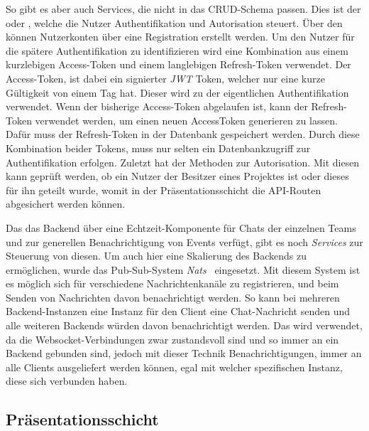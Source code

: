 So gibt es aber auch Services, die nicht in das CRUD-Schema passen. Dies ist
\zb{} der  oder , welche die Nutzer Authentifikation und
Autorisation steuert. Über den  können Nutzerkonten
über eine Registration erstellt werden. Um den Nutzer für die spätere Authentifikation zu
identifizieren wird eine Kombination aus einem kurzlebigen Access-Token und
einem langlebigen Refresh-Token verwendet. Der Access-Token, ist dabei ein
signierter \emph{JWT} Token, welcher nur eine kurze Gültigkeit von einem Tag
hat. Dieser wird zu der eigentlichen Authentifikation verwendet. Wenn der
bisherige Access-Token abgelaufen ist, kann der Refresh-Token verwendet werden,
um einen neuen AccessToken generieren zu lassen. Dafür muss der Refresh-Token
in der Datenbank gespeichert werden. Durch diese Kombination beider Tokens, muss
nur selten ein Datenbankzugriff zur Authentifikation erfolgen. Zuletzt hat der
 Methoden zur Autorisation. Mit diesen kann geprüft werden,
ob ein Nutzer der Besitzer eines Projektes ist oder dieses für ihn geteilt
wurde, womit in der Präsentationsschicht die API-Routen abgesichert werden können.

Das das Backend über eine Echtzeit-Komponente für Chats der einzelnen Teams und zur
generellen Benachrichtigung von Events verfügt, gibt es noch \emph{Services} zur Steuerung
von diesen. Um auch hier eine Skalierung des Backends zu ermöglichen, wurde das Pub-Sub-System \emph{Nats}~\cite{nats}
eingesetzt. Mit diesem System ist es möglich sich für verschiedene Nachrichtenkanäle zu registrieren,
und beim Senden von Nachrichten davon benachrichtigt werden. So kann \zb{} bei mehreren
Backend-Instanzen eine Instanz für den Client eine Chat-Nachricht senden und alle weiteren
Backends würden davon benachrichtigt werden. Das wird verwendet, da die Websocket-Verbindungen
zwar zustandsvoll sind und so immer an ein Backend gebunden sind, jedoch mit dieser Technik
Benachrichtigungen, immer an alle Clients ausgeliefert werden können, egal mit welcher spezifischen
Instanz, diese sich verbunden haben.

\subsection{Präsentationsschicht}

